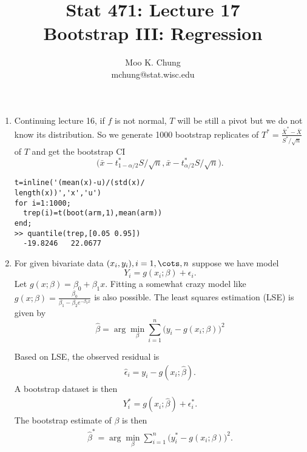 \documentclass[11pt,twocolumn]{article} %
\newcommand{\bqn}{\begin{eqnarray}}
\newcommand{\eqn}{\end{eqnarray}}
\begin{document}
\title{Stat 471: Lecture 17\\
Bootstrap III: Regression}
\author{Moo K. Chung\\
mchung@stat.wisc.edu}
\maketitle \thispagestyle{empty}
\begin{enumerate} 
\item Continuing lecture 16, if $f$ is not normal, $T$ will be still a pivot but we do not know its distribution. So we generate 1000 bootstrap replicates of $T^* = \frac{\bar X^* - \bar X}{S^*/\sqrt{n}}$ of $T$ and get the bootstrap CI
$$\Big(\bar x - t_{1-\alpha/2}^*S/\sqrt{n} , \bar x - t_{\alpha/2}^*S/\sqrt{n}\Big).$$
\begin{verbatim}
t=inline('(mean(x)-u)/(std(x)/
length(x))','x','u')
for i=1:1000;
  trep(i)=t(boot(arm,1),mean(arm))
end;
>> quantile(trep,[0.05 0.95])
  -19.8246   22.0677
\end{verbatim}


\item For given bivariate data $(x_i,y_i), i=1, \cots, n$ suppose we have model
$$Y_i = g(x_i; \beta) + \epsilon_i.$$
Let $g(x; \beta) = \beta_0 + \beta_1 x$. Fitting a somewhat crazy model like 
$g(x; \beta) = \frac{\beta_0}{\beta_1 - \beta_2 e^{-\beta_3 x}}$ is also possible. The least squares estimation (LSE) is given by
$$\hat \beta = \arg \min_{\beta} \sum_{i=1}^n \Big(y_i - g(x_i; \beta)\Big)^2$$

Based on LSE, the observed residual is
\bqn \hat \epsilon_i = y_i - g(x_i; \hat \beta). \label{eq:res}\eqn
A bootstrap dataset is then
\bqn Y_i^* = g(x_i; \hat \beta) + \epsilon_i^*. \label{eq:bs}\eqn
The bootstrap estimate of $\beta$ is then
\bqn \hat \beta^* = \arg \min_{\beta} \sum_{i=1}^n \Big(y_i^* - g(x_i; \beta)\Big)^2. \eqn


\end{enumerate}
\end{document}

